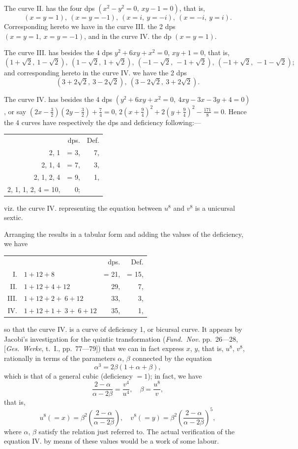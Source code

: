 \documentclass[11pt,a4paper]{book}
\begin{document}
The curve II. has the four dps $(x^2 - y^2 = 0, \ xy - 1 = 0)$, that is,
\[
(x = y = 1), \ (x = y = -1), \ (x = i, \ y = -i), \ (x = -i, \ y = i).
\]
Corresponding hereto we have in the curve III. the 2 dps $(x = y = 1, \ x = y = -1)$, and in the curve IV. the dp $(x = y = 1)$.

The curve III. has besides the 4 dps $y^2 + 6xy + x^2 = 0$, $xy + 1 = 0$, that is,
\[
(1 + \sqrt{2}, \ 1 - \sqrt{2}), \ (1 - \sqrt{2}, \ 1 + \sqrt{2}), \ (-1 - \sqrt{2}, \ -1 + \sqrt{2}), \ (-1 + \sqrt{2}, \ -1 - \sqrt{2});
\]
and corresponding hereto in the curve IV. we have the 2 dps
\[
(3 + 2\sqrt{2}, \ 3 - 2\sqrt{2}), \ (3 - 2\sqrt{2}, \ 3 + 2\sqrt{2}).
\]

The curve IV. has besides the 4 dps $(y^2 + 6xy + x^2 = 0, \ 4xy - 3x - 3y + 4 = 0)$, or say $(2x - \frac{3}{2})(2y - \frac{3}{2}) + \frac{7}{4} = 0$, $2(x + \frac{9}{4})^2 + 2(y + \frac{9}{4})^2 - \frac{171}{8} = 0$. Hence the 4 curves have respectively the dps and deficiency following:---
\begin{center}
\begin{tabular}{r@{\quad}r@{\quad}r}
& dps. & Def. \\
2, 1 & = 3, & 7, \\
2, 1, 4 & = 7, & 3, \\
2, 1, 2, 4 & = 9, & 1, \\
2, 1, 1, 2, 4 = 10, & 0;
\end{tabular}
\end{center}
viz. the curve IV. representing the equation between $u^8$ and $v^8$ is a unicursal sextic.

Arranging the results in a tabular form and adding the values of the deficiency, we have
\begin{center}
\begin{tabular}{r@{\quad}l@{\quad}r@{\quad}r}
& & dps. & Def. \\
I. & $1 + 12 + 8$ & = 21, & = 15, \\
II. & $1 + 12 + 4 + 12$ & 29, & 7, \\
III. & $1 + 12 + 2 + \ 6 + 12$ & 33, & 3, \\
IV. & $1 + 12 + 1 + \ 3 + \ 6 + 12$ & 35, & 1,
\end{tabular}
\end{center}
so that the curve IV. is a curve of deficiency 1, or bicursal curve. It appears by Jacobi's investigation for the quintic transformation (\textit{Fund.~Nov.} pp.~26---28, [\textit{Ges.~Werke}, t.~I., pp.~77---79]) that we can in fact express $x$, $y$, that is, $u^8$, $v^8$, rationally in terms of the parameters $\alpha$, $\beta$ connected by the equation
\[
\alpha^3 = 2\beta(1 + \alpha + \beta),
\]
which is that of a general cubic (deficiency $= 1$); in fact, we have
\[
\frac{2 - \alpha}{\alpha - 2\beta} = \frac{v^4}{u^4}, \quad \beta = \frac{u^8}{v},
\]
that is,
\[
u^8(= x) = \beta^2\left(\frac{2 - \alpha}{\alpha - 2\beta}\right), \quad v^8(= y) = \beta^2\left(\frac{2 - \alpha}{\alpha - 2\beta}\right)^5,
\]
where $\alpha$, $\beta$ satisfy the relation just referred to. The actual verification of the equation IV. by means of these values would be a work of some labour.
\end{document}

